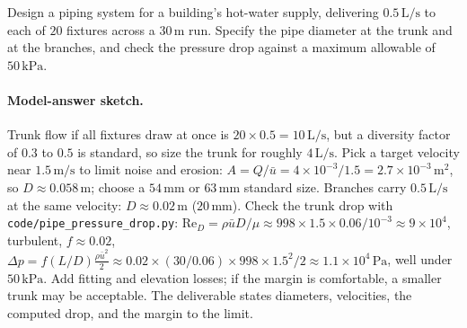 \begin{exercise}
Design a piping system for a building's hot-water supply,
delivering $0.5\,\text{L/s}$ to each of $20$ fixtures across a
$30\,\si{\meter}$ run. Specify the pipe diameter at the trunk and
at the branches, and check the pressure drop against a maximum
allowable of $50\,\text{kPa}$.

\paragraph{Model-answer sketch.} Trunk flow if all fixtures draw at
once is $20\times0.5 = 10\,\text{L/s}$, but a diversity factor of
$0.3$ to $0.5$ is standard, so size the trunk for roughly $4\,\text{
L/s}$. Pick a target velocity near $1.5\,\si{\meter\per\second}$ to
limit noise and erosion: $A = Q/\bar u = 4\times10^{-3}/1.5 =
2.7\times10^{-3}\,\si{\meter}^2$, so $D\approx0.058\,\si{\meter}$;
choose a $54\,\si{\milli\meter}$ or $63\,\si{\milli\meter}$ standard
size. Branches carry $0.5\,\text{L/s}$ at the same velocity:
$D\approx0.02\,\si{\meter}$ ($20\,\si{\milli\meter}$). Check the
trunk drop with \texttt{code/pipe\_pressure\_drop.py}:
$\text{Re}_D = \rho\bar u D/\mu\approx
998\times1.5\times0.06/10^{-3}\approx9\times10^{4}$, turbulent,
$f\approx0.02$, $\Delta p = f(L/D)\tfrac{\rho\bar u^2}{2}\approx
0.02\times(30/0.06)\times998\times1.5^2/2\approx1.1\times10^{4}\,\si{
\pascal}$, well under $50\,\text{kPa}$. Add fitting and elevation
losses; if the margin is comfortable, a smaller trunk may be
acceptable. The deliverable states diameters, velocities, the
computed drop, and the margin to the limit.
\end{exercise}

